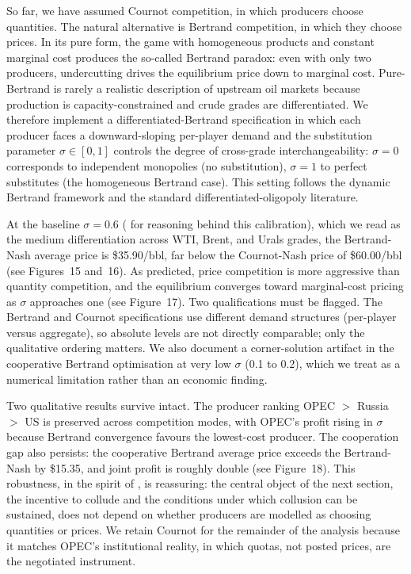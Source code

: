 So far, we have assumed Cournot competition, in which producers choose
quantities. The natural alternative is Bertrand competition, in which
they choose prices. In its pure form, the \citet{bertrand1883} game with
homogeneous products and constant marginal cost produces the so-called
Bertrand paradox: even with only two producers, undercutting drives the
equilibrium price down to marginal cost. Pure-Bertrand is rarely a
realistic description of upstream oil markets because production is
capacity-constrained and crude grades are differentiated. We therefore
implement a differentiated-Bertrand specification in which each producer
faces a downward-sloping per-player demand and the substitution
parameter $\sigma \in [0,1]$ controls the degree of cross-grade
interchangeability: $\sigma = 0$ corresponds to independent monopolies
(no substitution), $\sigma = 1$ to perfect substitutes (the homogeneous
Bertrand case). This setting follows the \citet{maskintirole1988}
dynamic Bertrand framework and the standard differentiated-oligopoly
literature.

At the baseline $\sigma = 0.6$ ( for reasoning behind this
calibration), which we read as the medium differentiation across WTI,
Brent, and Urals grades, the Bertrand-Nash average price is
\$35.90/bbl, far below the Cournot-Nash price of \$60.00/bbl (see
Figures~15 and~16). As \citet{bertrand1883} predicted, price competition
is more aggressive than quantity competition, and the equilibrium
converges toward marginal-cost pricing as $\sigma$ approaches one (see
Figure~17). Two qualifications must be flagged. The Bertrand and Cournot
specifications use different demand structures (per-player versus
aggregate), so absolute levels are not directly comparable; only the
qualitative ordering matters. We also document a corner-solution
artifact in the cooperative Bertrand optimisation at very low $\sigma$
(0.1 to 0.2), which we treat as a numerical limitation rather than an
economic finding.

Two qualitative results survive intact. The producer ranking
OPEC $>$ Russia $>$ US is preserved across competition modes, with
OPEC's profit rising in $\sigma$ because Bertrand convergence favours the
lowest-cost producer. The cooperation gap also persists: the cooperative
Bertrand average price exceeds the Bertrand-Nash by \$15.35, and joint
profit is roughly double (see Figure~18). This robustness, in the spirit
of \citet{maskintirole1988}, is reassuring: the central object of the
next section, the incentive to collude and the conditions under which
collusion can be sustained, does not depend on whether producers are
modelled as choosing quantities or prices. We retain Cournot for the
remainder of the analysis because it matches OPEC's institutional
reality, in which quotas, not posted prices, are the negotiated
instrument.
